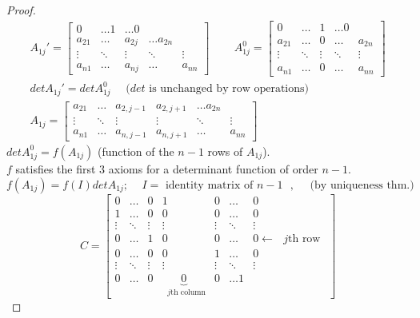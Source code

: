 \documentclass[twoside]{amsart}
\theoremstyle{plain}
\theoremstyle{definition}
\begin{document}
\begin{proof}
\[
\begin{gathered}
  A_{1j}' = \left[ \begin{matrix} 0 & \dots 1 & \dots 0 \\ a_{21} & \dots & a_{2j} & \dots a_{2n} \\ \vdots & \ddots & \vdots & \ddots & \vdots \\ a_{n1} & \dots & a_{nj} & \dots & a_{nn} \end{matrix} \right] \quad \quad \, A_{1j}^0 = \left[ \begin{matrix} 0 & \dots & 1 & \dots 0 \\ a_{21} & \dots & 0 & \dots & a_{2n} \\ \vdots & \ddots & \vdots & \ddots & \vdots \\ a_{n1} & \dots & 0 & \dots & a_{nn} \end{matrix} \right]   \\
  det{A_{1j}'} = det{A_{1j}^0} \quad \text{ ($det$ is unchanged by row operations) } \\
A_{1j} = \left[ \begin{matrix} a_{21} & \dots & a_{2,j-1} & a_{2,j+1} & \dots a_{2n} \\ \vdots & \ddots & \vdots & \vdots & \ddots & \vdots \\ a_{n1} & \dots & a_{n,j-1} & a_{n,j+1} & \dots & a_{nn} \end{matrix} \right]
\end{gathered}
\]
$det{A_{1j}^0} = f(A_{1j})$ (function of the $n-1$ rows of $A_{1j}$).  \\
$f$ satisfies the first $3$ axioms for a determinant function of order $n-1$.  
\[
f(A_{1j}) = f(I)  det{A_{1j}}; \quad \, I = \text{ identity matrix of $n-1$ }, \quad \text{ (by uniqueness thm.) }
\]
\[
C = \left[ \begin{matrix} 0 & \dots & 0 & 1 & 0 & \dots & 0 \\ 
    1 & \dots & 0 & 0 & 0 & \dots & 0 \\ \vdots & \ddots & \vdots & \vdots & \vdots & \ddots & \vdots \\ 0 & \dots & 1 & 0 & 0 & \dots & 0 \leftarrow \text{ $j$th row }\\ 0 & \dots & 0 & 0 & 1 & \dots & 0 \\ \vdots & \ddots & \vdots & \vdots & \vdots & \ddots & \vdots \\ 0 & \dots & 0 & \underbrace{0}_{\text{ $j$th column}} & 0 & \dots 1 \end{matrix} \right] 
\]
\end{proof}
\end{document}
